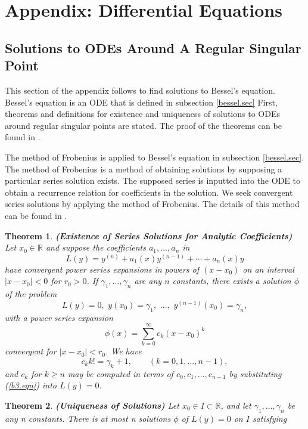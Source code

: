 \documentclass[12pt]{article}
\newtheorem{theorem}{Theorem}[section]
\theoremstyle{definition}
\numberwithin{equation}{section}
\begin{document}
{\section{Appendix: Differential Equations}
\subsection{Solutions to ODEs Around A Regular Singular Point}\label{ODEintro.sec}
This section of the appendix follows \cite{Codd} to find solutions to Bessel's equation. Bessel's equation is an ODE that is defined in subsection \ref{bessel.sec} First, theorems and definitions for existence and uniqueness of solutions to ODEs around regular singular points are stated. The proof of the theorems can be found in \cite{Codd}.

The method of Frobenius is applied to Bessel's equation in subsection \ref{bessel.sec}. The method of Frobenius is a method of obtaining solutions by supposing a particular series solution exists. The supposed series is inputted into the ODE to obtain a recurrence relation for coefficients in the solution. We seek convergent series solutions by applying the method of Frobenius. The details of this method can be found in \cite{Codd}.
\begin{theorem}\textbf{(Existence of Series Solutions for Analytic Coefficients)}
Let $x_0\in\mathbb{R}$ and suppose the coefficients $a_1,...,a_n$ in
\begin{equation}
L(y)=y^{(n)}+a_1(x)y^{(n-1)}+\cdots+a_n(x)y
\label{b2.eqn}
\end{equation}
have convergent power series expansions in powers of $(x-x_0)$ on an interval $\vert x-x_0\vert<0$ for $r_0>0$. If $\gamma_1,...,\gamma_n$ are any $n$ constants, there exists a solution $\phi$ of the problem $$L(y)=0,\,\,y(x_0)=\gamma_1,\,\,...,\,\,y^{(n-1)}(x_0)=\gamma_n,$$ with a power series expansion
\begin{equation}
\phi(x)=\sum_{k=0}^\infty c_k(x-x_0)^k
\label{b3.eqn}
\end{equation}
convergent for $\vert x-x_0\vert<r_0$. We have
$$c_kk!=\gamma_k+1,\qquad (k=0,1,...,n-1),$$ and $c_k$ for $k\geq n$ may be computed in terms of $c_0,c_1,...,c_{n-1}$ by substituting (\ref{b3.eqn}) into $L(y)=0$.
\end{theorem}
\begin{theorem}\label{thm3}\textbf{(Uniqueness of Solutions)}
Let $x_0\in I\subset\mathbb{R}$, and let $\gamma_1,...,\gamma_n$ be any n constants. There is at most n solutions $\phi$ of $L(y)=0$ on $I$ satisfying

\end{theorem}}
\end{document}
